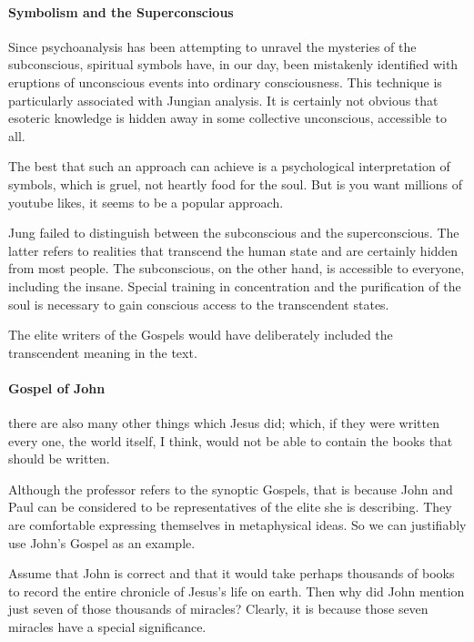\paragraph{Symbolism and the Superconscious}
Since psychoanalysis has been attempting to unravel the mysteries of the subconscious, spiritual symbols have, in our day, been mistakenly identified with eruptions of unconscious events into ordinary consciousness. This technique is particularly associated with Jungian analysis. It is certainly not obvious that esoteric knowledge is hidden away in some collective unconscious, accessible to all.

The best that such an approach can achieve is a psychological interpretation of symbols, which is gruel, not heartly food for the soul. But is you want millions of youtube likes, it seems to be a popular approach.

Jung failed to distinguish between the subconscious and the superconscious. The latter refers to realities that transcend the human state and are certainly hidden from most people. The subconscious, on the other hand, is accessible to everyone, including the insane. Special training in concentration and the purification of the soul is necessary to gain conscious access to the transcendent states.

The elite writers of the Gospels would have deliberately included the transcendent meaning in the text.

\paragraph{Gospel of John}
\begin{quotex}
there are also many other things which Jesus did; which, if they were written every one, the world itself, I think, would not be able to contain the books that should be written. 

\end{quotex}
Although the professor refers to the synoptic Gospels, that is because John and Paul can be considered to be representatives of the elite she is describing. They are comfortable expressing themselves in metaphysical ideas. So we can justifiably use John's Gospel as an example.

Assume that John is correct and that it would take perhaps thousands of books to record the entire chronicle of Jesus's life on earth. Then why did John mention just seven of those thousands of miracles? Clearly, it is because those seven miracles have a special significance.


